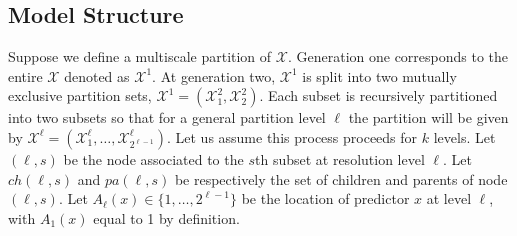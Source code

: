 \documentclass{article}
\begin{document}




\subsection{ Model Structure} %

Suppose we define a multiscale partition of $\mathcal{X}$.  Generation one corresponds to the entire $\mathcal{X}$ denoted as $\mathcal{X}^1$.  At generation two, $\mathcal{X}^1$ is split into two mutually exclusive partition sets, $\mathcal{X}^1=\left(\mathcal{X}^2_1, \mathcal{X}^2_2\right)$. Each subset is recursively partitioned into two subsets so that for a general partition level $\ell$ the partition will be given by $\mathcal{X}^{\ell}=\left(\mathcal{X}^{\ell}_1, \ldots, \mathcal{X}^{\ell}_{2^{\ell-1}}\right)$. Let us assume this process proceeds for $k$ levels. Let $(\ell,s)$ be the node associated to the $s$th subset at resolution level $\ell$. Let $ch(\ell,s)$ and $pa(\ell,s)$ be respectively the set of children and parents of node $(\ell, s)$. Let $A_{\ell}(x) \in \{1, \ldots, 2^{\ell-1}\}$ be the location of predictor $x$ at level $\ell$, with $A_1(x)$ equal to 1 by definition. 
\end{document}
